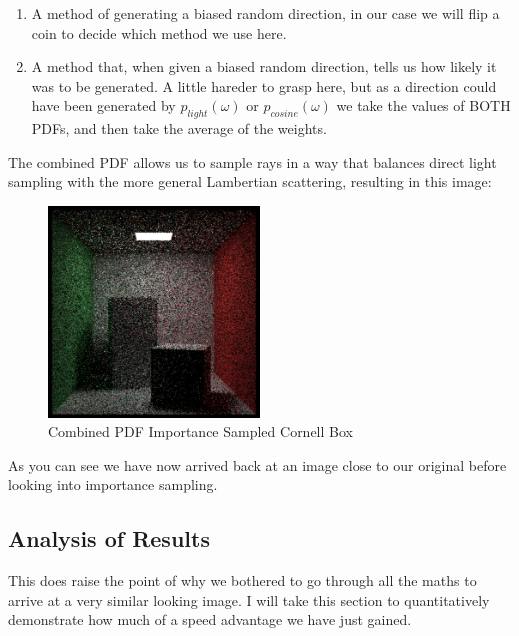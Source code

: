 \documentclass[12pt]{article}
\begin{document}
\begin{enumerate}
    \item A method of generating a biased random direction, in our case we will flip a coin to decide which method we use here.
    \item A method that, when given a biased random direction, tells us how likely it was to be generated. A little hareder to grasp here, but as a direction could have been generated by $p_{light}(\omega)$ or $p_{cosine}(\omega)$ we take the values of BOTH PDFs, and then take the average of the weights.
\end{enumerate}


The combined PDF allows us to sample rays in a way that balances direct light sampling with the more general Lambertian scattering, resulting in this image:

\begin{figure}[H]
    \centering
    \includegraphics[width=0.5\textwidth]{images/one_samp/combined_pdf.png}
    \caption{Combined PDF Importance Sampled Cornell Box}
    \label{fig:combinedPDFimportancesampled}
\end{figure}

As you can see we have now arrived back at an image close to our original before looking into importance sampling.

\subsection{Analysis of Results}

This does raise the point of why we bothered to go through all the maths to arrive at a very similar looking image. I will take this section to quantitatively demonstrate how much of a speed advantage we have just gained.
\end{document}
